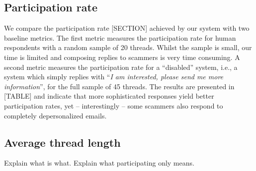 \begin{center}
\end{center}

\subsection{Participation rate}
We compare the participation rate [SECTION] achieved by our system with two baseline metrics. The first metric measures the participation rate for human respondents with a random sample of 20 threads. Whilst the sample is small, our time is limited and composing replies to scammers is very time consuming. A second metric measures the participation rate for a ``disabled'' system, i.e., a system which simply replies with ``\textit{I am interested, please send me more information}'', for the full sample of 45 threads.  The results are presented in [TABLE] and indicate that more sophisticated responses yield better participation rates, yet -- interestingly -- some scammers also respond to completely depersonalized emails.

\begin{center}
\end{center}
 
\subsection{Average thread length}
Explain what is what. Explain what participating only means.

\begin{center}
\end{center}


